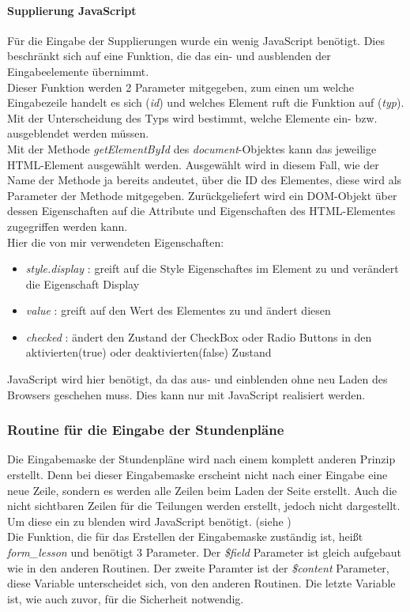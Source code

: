 \paragraph{Supplierung JavaScript}\label{sec:content_imple_input_java}
Für die Eingabe der Supplierungen wurde ein wenig JavaScript benötigt. Dies beschränkt sich auf eine Funktion, die das ein- und ausblenden der Eingabeelemente übernimmt.\\
Dieser Funktion werden 2 Parameter mitgegeben, zum einen um welche Eingabezeile handelt es sich (\textit{id}) und welches Element ruft die Funktion auf (\textit{typ}).\\
Mit der Unterscheidung des Typs wird bestimmt, welche Elemente ein- bzw. ausgeblendet werden müssen.\\
Mit der Methode \textit{getElementById} des \textit{document}-Objektes kann das jeweilige HTML-Element ausgewählt werden. Ausgewählt wird in diesem Fall, wie der Name der Methode ja bereits andeutet, über die ID des Elementes, diese wird als Parameter der Methode mitgegeben. Zurückgeliefert wird ein DOM-Objekt über dessen Eigenschaften auf die Attribute und Eigenschaften des HTML-Elementes zugegriffen werden kann.\\
Hier die von mir verwendeten Eigenschaften:
\begin{itemize}
	\item \textit{style.display} : greift auf die Style Eigenschaftes im Element zu und verändert die Eigenschaft Display
	\item \textit{value} : greift auf den Wert des Elementes zu und ändert diesen
	\item \textit{checked} : ändert den Zustand der CheckBox oder Radio Buttons in den aktivierten(true) oder deaktivierten(false) Zustand
\end{itemize}
JavaScript wird hier benötigt, da das aus- und einblenden ohne neu Laden des Browsers geschehen muss. Dies kann nur mit JavaScript realisiert werden.\\

\subsubsection{Routine für die Eingabe der Stundenpläne}
Die Eingabemaske der Stundenpläne wird nach einem komplett anderen Prinzip erstellt. Denn bei dieser Eingabemaske erscheint nicht nach einer Eingabe eine neue Zeile, sondern es werden alle Zeilen beim Laden der Seite erstellt. Auch die nicht sichtbaren Zeilen für die Teilungen werden erstellt, jedoch nicht dargestellt. Um diese ein zu blenden wird JavaScript benötigt. (siehe \nameref{})\\
Die Funktion, die für das Erstellen der Eingabemaske zuständig ist, heißt \textit{form\_lesson} und benötigt 3 Parameter. Der \textit{\$field} Parameter ist gleich aufgebaut wie in den anderen Routinen. Der zweite Paramter ist der \textit{\$content} Parameter, diese Variable unterscheidet sich, von den anderen Routinen. Die letzte Variable ist, wie auch zuvor, für die Sicherheit notwendig.
